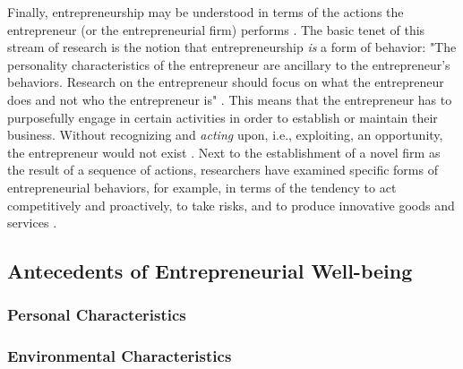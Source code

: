 \documentclass[a4paper,man,natbib]{apa6}
\begin{document}
Finally, entrepreneurship may be understood in terms of the actions the entrepreneur (or the entrepreneurial firm) performs \cite[e.g.][]{Gartner1988, Lumpkin1996, Covin1991}. The basic tenet of this stream of research is the notion that entrepreneurship \textit{is} a form of behavior: "The personality characteristics of the entrepreneur are ancillary to the entrepreneur's behaviors. Research on the entrepreneur should focus on what the entrepreneur does and not who the entrepreneur is" \cite[p.~57]{Gartner1988}. This means that the entrepreneur has to purposefully engage in certain activities in order to establish or maintain their business. Without recognizing and \textit{acting} upon, i.e., exploiting, an opportunity, the entrepreneur would not exist \citep{Gartner1988}. Next to the establishment of a novel firm as the result of a sequence of actions, researchers have examined specific forms of entrepreneurial behaviors, for example, in terms of the tendency to act competitively and proactively, to take risks, and to produce innovative goods and services \citep{Covin1991}. 

\subsection{Antecedents of Entrepreneurial Well-being}

\subsubsection{Personal Characteristics}
\subsubsection{Environmental Characteristics}
\end{document}
